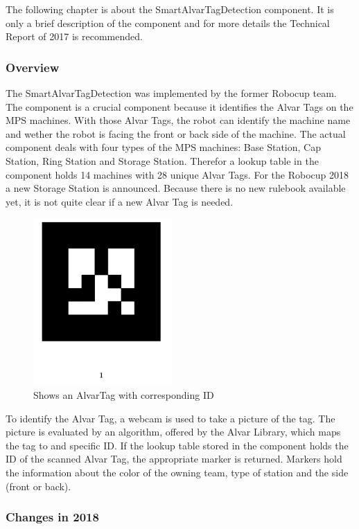 The following chapter is about the SmartAlvarTagDetection component. It is only a brief description of the component and for more details the Technical Report of 2017 \cite{TR17} is recommended. 

\subsubsection{Overview}


The SmartAlvarTagDetection was implemented by the former Robocup team. The component is a crucial component because it identifies the Alvar Tags on the MPS machines. With those Alvar Tags, the robot can identify the machine name and wether the robot is facing the front or back side of the machine. The actual component deals with four types of the MPS machines: Base Station, Cap Station, Ring Station and Storage Station. Therefor a lookup table in the component holds 14 machines with 28 unique Alvar Tags.
For the Robocup 2018 a new Storage Station is announced. Because there is no new rulebook available yet, it is not quite clear if a new Alvar Tag is needed.

\begin{figure}[h]
\centering
\includegraphics[scale=0.75]{pic/numberedMarker.png}
\caption{Shows an AlvarTag with corresponding ID}
\label{fig:smartAlvarFlow}
\end{figure}

To identify the Alvar Tag, a webcam is used to take a picture of the tag. The picture is evaluated by an algorithm, offered by the Alvar Library, which maps the tag to and specific ID. If the lookup table stored in the component holds the ID of the scanned Alvar Tag, the appropriate marker is returned. Markers hold the information about the color of the owning team, type of station and the side (front or back). 


\subsubsection{Changes in 2018}

